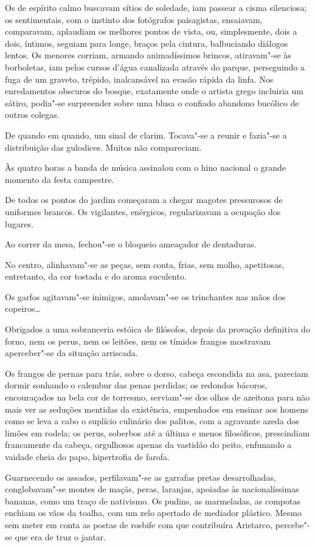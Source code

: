 Os de espírito calmo
buscavam sítios de soledade, iam passear a cisma silenciosa; os
sentimentais, com o instinto dos fotógrafos paisagistas, ensaiavam,
comparavam, aplaudiam os melhores pontos de vista, ou, simplesmente,
dois a dois, íntimos, seguiam para longe, braços pela cintura,
balbuciando diálogos lentos. Os menores corriam, armando animadíssimos
brincos, atiravam"-se às borboletas, iam pelos cursos d'água
canalizada através do parque, perseguindo a fuga de um graveto,
trépido, inalcansável na evasão rápida da linfa. Nos enredamentos
obscuros do bosque, exatamente onde o artista grego incluiria um
sátiro, podia"-se surpreender sobre uma blusa o confiado abandono
bucólico de outros colegas. 

De quando em quando, um sinal de clarim.
Tocava"-se a reunir e fazia"-se a distribuição das gulodices. Muitos
não compareciam. 

Às quatro horas a banda de música assinalou com o hino
nacional o grande momento da festa campestre. 

De todos os pontos do
jardim começaram a chegar magotes pressurosos de uniformes brancos. Os
vigilantes, enérgicos, regularizavam a ocupação dos lugares. 

Ao correr da mesa, fechou"-se o bloqueio ameaçador de dentaduras. 

No centro, alinhavam"-se as peças, sem conta, frias, sem molho, apetitosas,
entretanto, da cor tostada e do aroma suculento. 

Os garfos agitavam"-se inimigos, amolavam"-se os trinchantes nas mãos dos
copeiros\ldots{} 

Obrigados a uma sobranceria estóica de filósofos, depois da
provação definitiva do forno, nem os perus, nem os leitões, nem os
tímidos frangos mostravam aperceber"-se da situação arriscada. 

Os frangos de pernas para trás, sobre o dorso, cabeça escondida na asa,
pareciam dormir sonhando o calembur das penas perdidas; os redondos
bácoros, encouraçados na bela cor de torresmo, serviam"-se 
dos olhos de azeitona para não mais ver as seduções mentidas da
existência, empenhados em ensinar aos homens como se leva a cabo o
suplício culinário dos palitos, com a agravante azeda dos limões em
rodela; os perus, soberbos até a última e menos filosóficos,
prescindiam francamente da cabeça, orgulhosos apenas da vastidão do
peito, enfunando a vaidade cheia do papo, hipertrofia de farofa.

Guarnecendo os assados, perfilavam"-se as garrafas pretas
desarrolhadas, conglobavam"-se montes de maçãs, peras, laranjas,
apoiadas às nacionalíssimas bananas, como um traço de nativismo. Os
pudins, as marmeladas, as compotas enchiam os vãos da toalha, com um
zelo apertado de mediador plástico. Mesmo sem meter em conta as postas
de rosbife com que contribuíra Aristarco, percebe"-se que era de truz
o jantar. 

